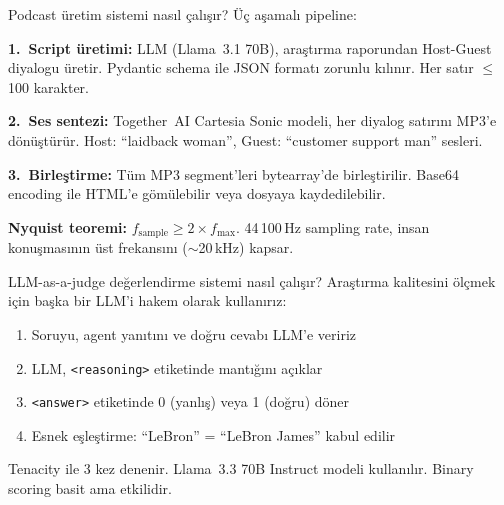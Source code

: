 \begin{mulakat}{Podcast \"{u}retim sistemi nas{\i}l \c{c}al{\i}\c{s}{\i}r?}
\"{U}\c{c} a\c{s}amal{\i} pipeline:

\textbf{1.~Script \"{u}retimi:} LLM (Llama~3.1 70B), ara\c{s}t{\i}rma raporundan Host-Guest diyalogu \"{u}retir. Pydantic schema ile JSON format{\i} zorunlu k{\i}l{\i}n{\i}r. Her sat{\i}r $\leq$100 karakter.

\textbf{2.~Ses sentezi:} Together~AI Cartesia Sonic modeli, her diyalog sat{\i}r{\i}n{\i} MP3'e d\"{o}n\"{u}\c{s}t\"{u}r\"{u}r. Host: ``laidback woman'', Guest: ``customer support man'' sesleri.

\textbf{3.~Birle\c{s}tirme:} T\"{u}m MP3 segment'leri bytearray'de birle\c{s}tirilir. Base64 encoding ile HTML'e g\"{o}m\"{u}lebilir veya dosyaya kaydedilebilir.

\textbf{Nyquist teoremi:} $f_{\text{sample}} \geq 2 \times f_{\max}$. 44\,100\,Hz sampling rate, insan konu\c{s}mas{\i}n{\i}n \"{u}st frekans{\i}n{\i} ($\sim$20\,kHz) kapsar.
\end{mulakat}

\begin{mulakat}{LLM-as-a-judge de\u{g}erlendirme sistemi nas{\i}l \c{c}al{\i}\c{s}{\i}r?}
Ara\c{s}t{\i}rma kalitesini \"{o}l\c{c}mek i\c{c}in ba\c{s}ka bir LLM'i hakem olarak kullan{\i}r{\i}z:

\begin{enumerate}
  \item Soruyu, agent yan{\i}t{\i}n{\i} ve do\u{g}ru cevab{\i} LLM'e veririz
  \item LLM, \texttt{<reasoning>} etiketinde mant{\i}\u{g}{\i}n{\i} a\c{c}{\i}klar
  \item \texttt{<answer>} etiketinde 0 (yanl{\i}\c{s}) veya 1 (do\u{g}ru) d\"{o}ner
  \item Esnek e\c{s}le\c{s}tirme: ``LeBron'' = ``LeBron James'' kabul edilir
\end{enumerate}

Tenacity ile 3 kez denenir. Llama~3.3 70B Instruct modeli kullan{\i}l{\i}r. Binary scoring bas{i}t ama etkilidir.
\end{mulakat}

